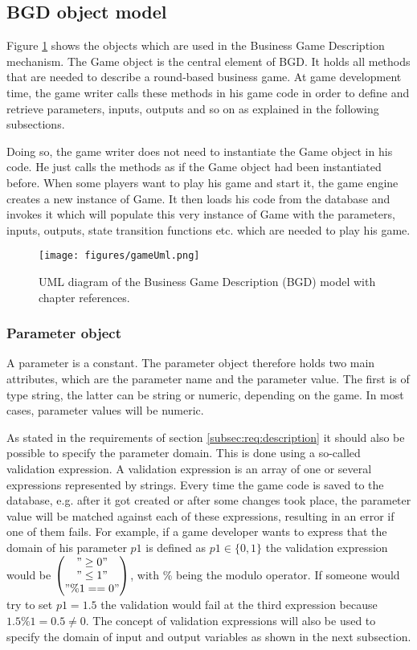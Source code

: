 \subsection{BGD object model}
\label{subsec:bgd:model}

Figure \ref{fig:uml} shows the objects which are used in the Business Game Description mechanism. The Game object is the central element of BGD. It holds all methods that are needed to describe a round-based business game. At game development time, the game writer calls these methods in his game code in order to define and retrieve parameters, inputs, outputs and so on as explained in the following subsections. 

Doing so, the game writer does not need to instantiate the Game object in his code. He just calls the methods as if the Game object had been instantiated before. When some players want to play his game and start it, the game engine creates a new instance of Game. It then loads his code from the database and invokes it which will populate this very instance of Game with the parameters, inputs, outputs, state transition functions etc. which are needed to play his game.

\begin{figure}
	\centering
	\texttt{[image: figures/gameUml.png]}
	\caption{UML diagram of the Business Game Description (BGD) model with chapter references.}
	\label{fig:uml}
\end{figure}

\subsubsection{Parameter object}
\label{subsub:parameters}

A parameter is a constant. The parameter object therefore holds two main attributes, which are the parameter name and the parameter value. The first is of type string, the latter can be string or numeric, depending on the game. In most cases, parameter values will be numeric.

As stated in the requirements of section \ref{subsec:req:description} it should also be possible to specify the parameter domain. This is done using a so-called validation expression. A validation expression is an array of one or several expressions represented by strings. Every time the game code is saved to the database, e.g. after it got created or after some changes took place, the parameter value will be matched against each of these expressions, resulting in an error if one of them fails. For example, if a game developer wants to express that the domain of his parameter $p1$ is defined as $p1 \in \{0,1\}$ the validation expression would be $\begin{pmatrix}
"\ge0"\\"\le1"\\"\%1==0"
\end{pmatrix}$, with \% being the modulo operator. If someone would try to set $p1 = 1.5$ the validation would fail at the third expression because $1.5\%1=0.5\neq0$. The concept of validation expressions will also be used to specify the domain of input and output variables as shown in the next subsection.

